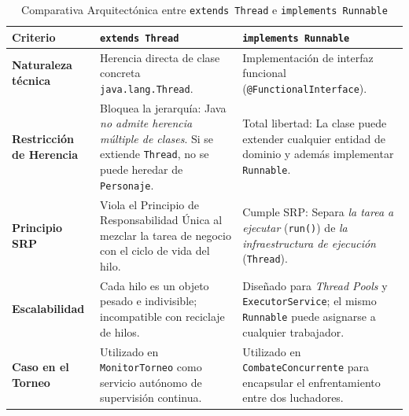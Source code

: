 \documentclass[11pt,letterpaper]{article}
\begin{document}
\begin{table}[h!]
    \centering
    \caption{Comparativa Arquitectónica entre \texttt{extends Thread} e \texttt{implements Runnable}}
    \label{tab:thread_vs_runnable}
    \vspace{0.2cm}
    \small
    \begin{tabularx}{\textwidth}{p{3.2cm}X X}
        \toprule
        \textbf{Criterio} & \textbf{\texttt{extends Thread}} & \textbf{\texttt{implements Runnable}} \\
        \midrule
        \textbf{Naturaleza técnica} & Herencia directa de clase concreta \texttt{java.lang.Thread}. & Implementación de interfaz funcional (\texttt{@FunctionalInterface}). \\
        \textbf{Restricción de Herencia} & Bloquea la jerarquía: Java \textit{no admite herencia múltiple de clases}. Si se extiende \texttt{Thread}, no se puede heredar de \texttt{Personaje}. & Total libertad: La clase puede extender cualquier entidad de dominio y además implementar \texttt{Runnable}. \\
        \textbf{Principio SRP} & Viola el Principio de Responsabilidad Única al mezclar la tarea de negocio con el ciclo de vida del hilo. & Cumple SRP: Separa \textit{la tarea a ejecutar} (\texttt{run()}) de \textit{la infraestructura de ejecución} (\texttt{Thread}). \\
        \textbf{Escalabilidad} & Cada hilo es un objeto pesado e indivisible; incompatible con reciclaje de hilos. & Diseñado para \textit{Thread Pools} y \texttt{ExecutorService}; el mismo \texttt{Runnable} puede asignarse a cualquier trabajador. \\
        \textbf{Caso en el Torneo} & Utilizado en \texttt{MonitorTorneo} como servicio autónomo de supervisión continua. & Utilizado en \texttt{CombateConcurrente} para encapsular el enfrentamiento entre dos luchadores. \\
        \bottomrule
    \end{tabularx}
\end{table}
\end{document}
